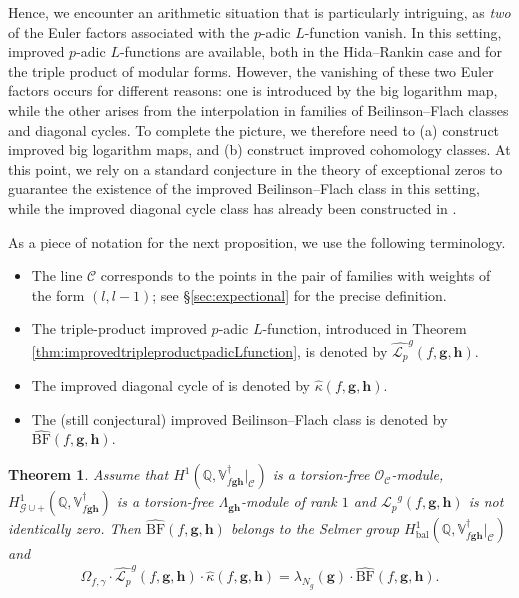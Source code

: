 \documentclass[a4paper,11pt]{amsart}
\theoremstyle{plain}
\newtheorem{theorem}{Theorem}[section]
\theoremstyle{definition}
\theoremstyle{remark}
\newcommand{\bb}{\mathbb}
\newcommand{\cl}{\mathcal}
\DeclareMathOperator{\bal}{bal}
\newcommand{\Lp}{{\mathscr{L}_p}}
\newcommand{\hg}{{\mathbf{g}}}
\newcommand{\hh}{{\mathbf h}}
\numberwithin{equation}{section}
\begin{document}
Hence, we encounter an arithmetic situation that is particularly intriguing, as {\em two} of the Euler factors associated with the $p$-adic $L$-function vanish. In this setting, improved $p$-adic $L$-functions are available, both in the Hida--Rankin case and for the triple product of modular forms. However, the vanishing of these two Euler factors occurs for different reasons: one is introduced by the big logarithm map, while the other arises from the interpolation in families of Beilinson--Flach classes and diagonal cycles. To complete the picture, we therefore need to (a) construct improved big logarithm maps, and (b) construct improved cohomology classes. At this point, we rely on a standard conjecture in the theory of exceptional zeros to guarantee the existence of the improved Beilinson--Flach class in this setting, while the improved diagonal cycle class has already been constructed in \cite{BSV}.

As a piece of notation for the next proposition, we use the following terminology.
\begin{itemize}
    \item[-] The line $\mathcal C$ corresponds to the points in the pair of families with weights of the form $(l,l-1)$; see \S\ref{sec:expectional} for the precise definition.
    \item[-] The triple-product improved $p$-adic $L$-function, introduced in Theorem \ref{thm:improvedtripleproductpadicLfunction}, is denoted by $\widehat{\Lp}^g(f,\hg,\hh)$.
    \item[-] The improved diagonal cycle of \cite{BSV} is denoted by $\widehat{\kappa}(f,\hg,\hh)$.
    \item[-] The (still conjectural) improved Beilinson--Flach class is denoted by $\widehat{\mathrm{BF}}(f, \hg, \hh)$.
\end{itemize}

\begin{theorem}
Assume that $H^1(\bb{Q},\bb{V}_{f\hg\hh}^\dagger\vert_{\cl{C}})$ is a torsion-free $\cl{O}_{\cl{C}}$-module, $H^1_{\cl{G}\cup +}(\bb{Q},\bb{V}_{f\hg\hh}^\dagger)$ is a torsion-free $\Lambda_{\hg\hh}$-module of rank $1$ and $\Lp^g(f,\hg,\hh)$ is not identically zero. Then $\widehat{\mathrm{BF}}(f, \hg, \hh)$ belongs to the Selmer group $H^1_{\bal}(\bb{Q},\bb{V}_{f\hg\hh}^\dagger\vert_{\cl{C}})$ and
\[
\Omega_{f,\gamma} \cdot \widehat{\Lp}^g(f,\hg,\hh) \cdot \widehat{\kappa}(f,\hg,\hh) = \lambda_{N_g}(\hg)\cdot\widehat{\mathrm{BF}}(f, \hg, \hh).
\]
\end{theorem}
\end{document}

